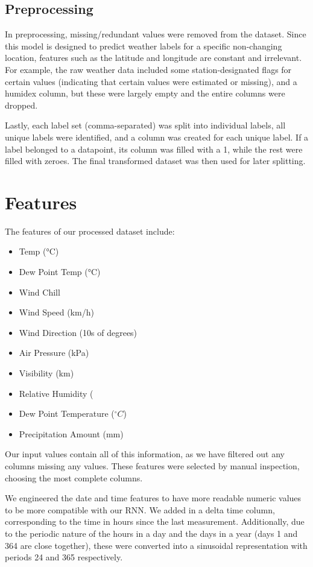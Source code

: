 \documentclass[11pt]{article}
\begin{document}
\subsection{Preprocessing} %

In preprocessing, missing/redundant values were removed from the dataset. Since this model is designed to predict weather labels for a specific non-changing location, features such as the latitude and longitude are constant and irrelevant. For example, the raw weather data included some station-designated flags for certain values (indicating that certain values were estimated or missing), and a humidex column, but these were largely empty and the entire columns were dropped.

Lastly, each label set (comma-separated) was split into individual labels, all unique labels were identified, and a column was created for each unique label. If a label belonged to a datapoint, its column was filled with a 1, while the rest were filled with zeroes. The final transformed dataset was then used for later splitting.

\section{Features} %

The features of our processed dataset include:
\begin{itemize}[nosep]
        \item Temp (°C)
        \item Dew Point Temp (°C)
        \item Wind Chill
        \item Wind Speed (km/h)
        \item Wind Direction (10s of degrees)
        \item Air Pressure (kPa)
        \item Visibility (km)
        \item Relative Humidity (%
        \item Dew Point Temperature ($^{\circ}C$)
        \item Precipitation Amount (mm)
\end{itemize}

Our input values contain all of this information, as we have filtered out any columns missing any values. These features were selected by manual inspection, choosing the most complete columns.

We engineered the date and time features to have more readable numeric values to be more compatible with our RNN. We added in a delta time column, corresponding to the time in hours since the last measurement. Additionally, due to the periodic nature of the hours in a day and the days in a year (days 1 and 364 are close together), these were converted into a sinusoidal representation with periods 24 and 365 respectively.
\end{document}

